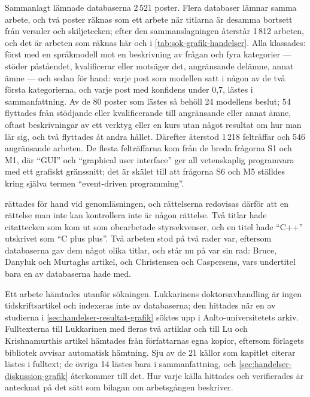Sammanlagt lämnade databaserna 2\,521 poster.  Flera databaser lämnar
samma arbete, och två poster räknas som ett arbete när titlarna är
desamma bortsett från versaler och skiljetecken; efter den
sammanslagningen återstår 1\,812 arbeten, och det är arbeten som räknas
här och i \cref{tab:sok-grafik-handelser}.  Alla klassades: först med
en språkmodell mot en beskrivning av frågan och fyra kategorier ---
stöder påståendet, kvalificerar eller motsäger det, angränsande
delämne, annat ämne --- och sedan för hand: varje post som modellen
satt i någon av de två första kategorierna, och varje post med
konfidens under 0,7, lästes i sammanfattning.  Av de 80 poster som
lästes så behöll 24 modellens beslut; 54 flyttades från stödjande
eller kvalificerande till angränsande eller annat ämne, oftast
beskrivningar av ett verktyg eller en kurs utan något resultat om
hur man lär sig, och två flyttades åt andra hållet.  Därefter återstod
1\,218 felträffar och 546 angränsande arbeten.  De flesta felträffarna
kom från de breda frågorna S1 och M1, där \enquote{GUI} och
\enquote{graphical user interface} ger all vetenskaplig programvara
med ett grafiskt gränssnitt; det är skälet till att frågorna S6 och M5
ställdes kring själva termen \enquote{event-driven programming}.

 rättades för hand vid genomläsningen,
och rättelserna redovisas därför att en rättelse man inte kan
kontrollera inte är någon rättelse.  Två titlar hade citattecken som
kom ut som obearbetade styrsekvenser, och en titel hade \enquote{C++}
utskrivet som \enquote{C plus plus}.  Två arbeten stod på två rader
var, eftersom databaserna gav dem något olika titlar, och står nu på
var sin rad: Bruce, Danyluk och Murtaghs artikel, och Christensen och
Caspersens, vars undertitel bara en av databaserna hade med.

Ett arbete hämtades utanför sökningen.  Lukkarinens
doktorsavhandling \autocite{Lukkarinen2022Thesis} är ingen
tidskriftsartikel och indexeras inte av databaserna; den hittades när
en av studierna i \cref{sec:handelser-resultat-grafik} söktes upp i
Aalto-universitetets arkiv.  Fulltexterna till Lukkarinen
med fleras två artiklar \autocite{Lukkarinen2021Mapping,
Lukkarinen2021Listener} och till Lu och Krishnamurthis artikel
\autocite{LuKrishnamurthi2024} hämtades från författarnas egna kopior,
eftersom förlagets bibliotek avvisar automatisk hämtning.  Sju av de
21 källor som kapitlet citerar lästes i fulltext; de övriga 14 lästes
bara i sammanfattning, och \cref{sec:handelser-diskussion-grafik}
återkommer till det.  Hur varje källa hittades och verifierades är
antecknat på det sätt som bilagan om arbetsgången beskriver.

